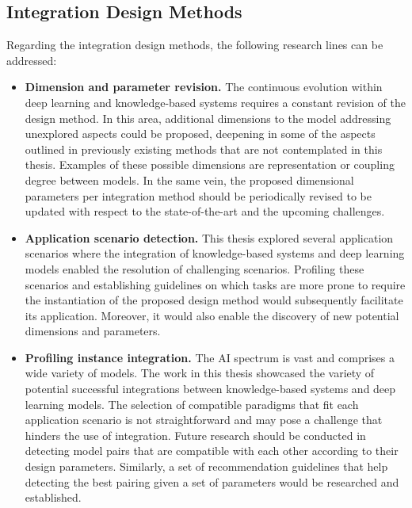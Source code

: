 \subsection*{Integration Design Methods}
Regarding the integration design methods, the following research lines can be addressed:
\begin{itemize}
    \item \textbf{Dimension and parameter revision.} The continuous evolution within deep learning and knowledge-based systems requires a constant revision of the design method. In this area, additional dimensions to the model addressing unexplored aspects could be proposed, deepening in some of the aspects outlined in previously existing methods that are not contemplated in this thesis. Examples of these possible dimensions are representation or coupling degree between models. In the same vein, the proposed dimensional parameters per integration method should be periodically revised to be updated with respect to the state-of-the-art and the upcoming challenges. 
    
    \item \textbf{Application scenario detection.} This thesis explored several application scenarios where the integration of knowledge-based systems and deep learning models enabled the resolution of challenging scenarios. Profiling these scenarios and establishing guidelines on which tasks are more prone to require the instantiation of the proposed design method would subsequently facilitate its application. Moreover, it would also enable the discovery of new potential dimensions and parameters. 
    
    \item \textbf{Profiling instance integration.} The AI spectrum is vast and comprises a wide variety of models. The work in this thesis showcased the variety of potential successful integrations between knowledge-based systems and deep learning models. The selection of compatible paradigms that fit each application scenario is not straightforward and may pose a challenge that hinders the use of integration. Future research should be conducted in detecting model pairs that are compatible with each other according to their design parameters. Similarly, a set of recommendation guidelines that help detecting the best pairing given a set of parameters would be researched and established.
\end{itemize}


